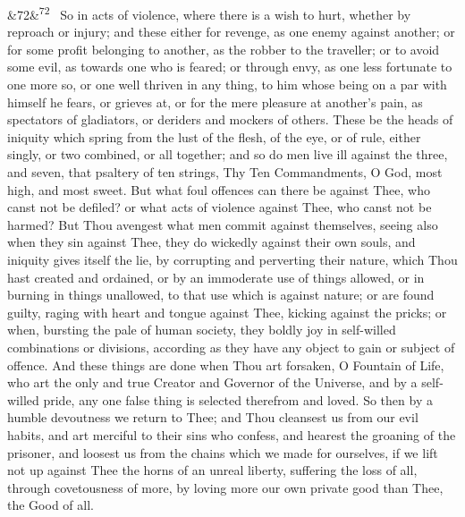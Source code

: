 \documentclass[12pt]{article}
\newcommand{\para}[1][]{\par\noindent\ifx&#1&\else\textsuperscript{\footnotesize #1}~\fi}
\begin{document}
\para[72] So in acts of violence, where there is a wish to hurt, whether by reproach or injury; and these either for revenge, as one enemy against another; or for some profit belonging to another, as the robber to the traveller; or to avoid some evil, as towards one who is feared; or through envy, as one less fortunate to one more so, or one well thriven in any thing, to him whose being on a par with himself he fears, or grieves at, or for the mere pleasure at another's pain, as spectators of gladiators, or deriders and mockers of others. These be the heads of iniquity which spring from the lust of the flesh, of the eye, or of rule, either singly, or two combined, or all together; and so do men live ill against the three, and seven, that psaltery of ten strings, Thy Ten Commandments, O God, most high, and most sweet. But what foul offences can there be against Thee, who canst not be defiled? or what acts of violence against Thee, who canst not be harmed? But Thou avengest what men commit against themselves, seeing also when they sin against Thee, they do wickedly against their own souls, and iniquity gives itself the lie, by corrupting and perverting their nature, which Thou hast created and ordained, or by an immoderate use of things allowed, or in burning in things unallowed, to that use which is against nature; or are found guilty, raging with heart and tongue against Thee, kicking against the pricks; or when, bursting the pale of human society, they boldly joy in self-willed combinations or divisions, according as they have any object to gain or subject of offence. And these things are done when Thou art forsaken, O Fountain of Life, who art the only and true Creator and Governor of the Universe, and by a self-willed pride, any one false thing is selected therefrom and loved. So then by a humble devoutness we return to Thee; and Thou cleansest us from our evil habits, and art merciful to their sins who confess, and hearest the groaning of the prisoner, and loosest us from the chains which we made for ourselves, if we lift not up against Thee the horns of an unreal liberty, suffering the loss of all, through covetousness of more, by loving more our own private good than Thee, the Good of all.
\end{document}
